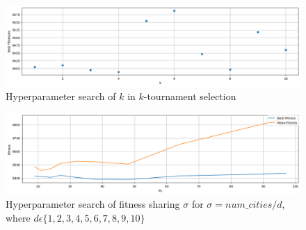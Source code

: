 \documentclass[a4paper,10pt]{article}
\newcommand{\ReplaceMe}[1]{{\color{blue}#1}}
\begin{document}
\begin{figure}[H]
\includegraphics[width=\textwidth]{results/tuning/k_hyperparamter_search.png}
\caption{Hyperparameter search of $k$ in $k$-tournament selection}
\label{fig:k_search}
\end{figure}%

\begin{figure}[H]
\includegraphics[width=\textwidth]{results/tuning/fs_sigma_hyperparamter_search.png}
\caption{Hyperparameter search of fitness sharing $\sigma$ for $\sigma=num\_cities/d$, where $d \epsilon \{1,2,3,4,5,6,7,8,9,10\}$}
\label{fig:sigma_search}
\end{figure}%




\end{document}
